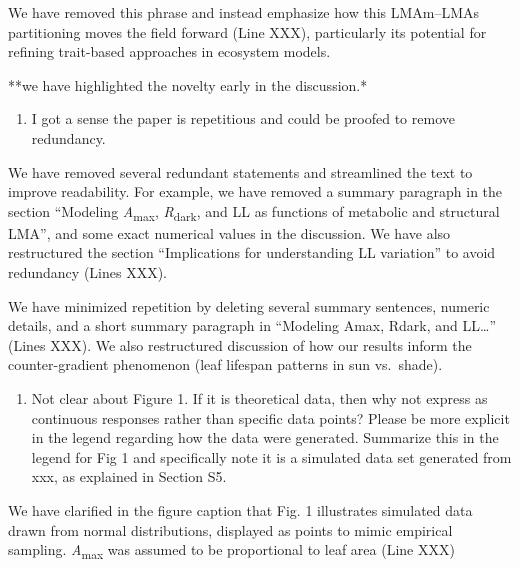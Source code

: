 \documentclass[
  12pt,
  letterpaper,
  DIV=11,
  numbers=noendperiod]{scrartcl}
\providecommand{\tightlist}{%
  \setlength{\itemsep}{0pt}\setlength{\parskip}{0pt}}\usepackage{longtable,booktabs,array}
\renewenvironment{quote}
  {\begin{customblockquote}\color{blockquote-text}\ignorespaces}
  {\end{customblockquote}}
\begin{document}
We have removed this phrase and instead emphasize how this LMAm--LMAs
partitioning moves the field forward (Line XXX), particularly its
potential for refining trait-based approaches in ecosystem models.

**we have highlighted the novelty early in the discussion.*

\begin{quote}
\begin{enumerate}
\def\labelenumi{\arabic{enumi})}
\setcounter{enumi}{4}
\tightlist
\item
  I got a sense the paper is repetitious and could be proofed to remove
  redundancy.
\end{enumerate}
\end{quote}

We have removed several redundant statements and streamlined the text to
improve readability. For example, we have removed a summary paragraph in
the section ``Modeling \emph{A}\textsubscript{max},
\emph{R}\textsubscript{dark}, and LL as functions of metabolic and
structural LMA'', and some exact numerical values in the discussion. We
have also restructured the section ``Implications for understanding LL
variation'' to avoid redundancy (Lines XXX).

We have minimized repetition by deleting several summary sentences,
numeric details, and a short summary paragraph in ``Modeling Amax,
Rdark, and LL\ldots{}'' (Lines XXX). We also restructured discussion of
how our results inform the counter-gradient phenomenon (leaf lifespan
patterns in sun vs.~shade).

\begin{quote}
\begin{enumerate}
\def\labelenumi{\arabic{enumi})}
\setcounter{enumi}{5}
\tightlist
\item
  Not clear about Figure 1. If it is theoretical data, then why not
  express as continuous responses rather than specific data points?
  Please be more explicit in the legend regarding how the data were
  generated. Summarize this in the legend for Fig 1 and specifically
  note it is a simulated data set generated from xxx, as explained in
  Section S5.
\end{enumerate}
\end{quote}

We have clarified in the figure caption that Fig. 1 illustrates
simulated data drawn from normal distributions, displayed as points to
mimic empirical sampling. \emph{A}\textsubscript{max} was assumed to be
proportional to leaf area (Line XXX)
\end{document}
